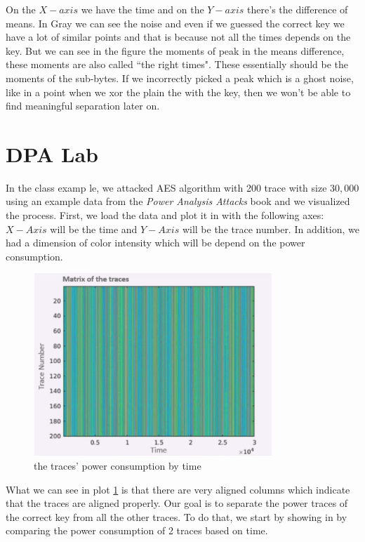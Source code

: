 On the $X-axis$ we have the time and on the $Y-axis$ there's the difference of means. In Gray we can see the noise and even if we guessed the correct key we have a lot of similar points and that is because not all the times depends on the key. But we can see in the figure the moments of peak in the means difference, these moments are also called ``the right times". These essentially should be the moments of the sub-bytes. If we incorrectly picked a peak which is a ghost noise, like in a point when we xor the plain the with the key, then we won't be able to find meaningful separation later on.

\section{DPA Lab}
In the class examp
le, we attacked AES algorithm with 200 trace with size $30,000$ using an example data from the \textit{Power Analysis Attacks} book and we visualized the process.
First, we load the data and plot it in  with the following axes: $X-Axis$ will be the time and $Y-Axis$ will be the trace number. In addition, we had a dimension of color intensity which will be depend on the power consumption.

\begin{figure}[!ht]
    \centering
    \includegraphics[width=0.8\textwidth]{images/Lecture6/traceByTime.png}
    \caption{the traces' power consumption by time} \label{fig:traceByTime}
\end{figure}

What we can see in plot \ref{fig:traceByTime} is that there are very aligned columns which indicate that the traces are aligned properly.
Our goal is to separate the power traces of the correct key from all the other traces. To do that, we start by showing in  by comparing the power consumption of 2 traces based on time.

